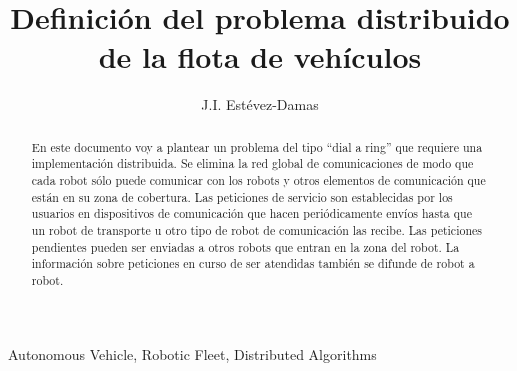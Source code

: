 \documentclass[preprint,12pt]{elsarticle}
\begin{document}
\begin{frontmatter}



\title{Definición del problema distribuido de la flota de vehículos}

\author[label1]{J.I. Estévez-Damas}
\address[label1]{Universidad de La Laguna, Spain}

\begin{abstract}
En este documento voy a plantear un problema del tipo ``dial a ring'' que requiere una implementación distribuida. Se elimina la red global de comunicaciones de modo que cada robot sólo puede comunicar con los robots y otros elementos de comunicación que están en su zona de cobertura. Las peticiones de servicio son establecidas por los usuarios en dispositivos de comunicación que hacen periódicamente envíos hasta que un robot de transporte u otro tipo de robot de comunicación las recibe. Las peticiones pendientes pueden ser enviadas a otros robots que entran en la zona del robot. La información sobre peticiones en curso de ser atendidas también se difunde de robot a robot. 

\end{abstract}

\begin{keyword}
Autonomous Vehicle, Robotic Fleet, Distributed Algorithms


\end{keyword}

\end{frontmatter}
\end{document}
